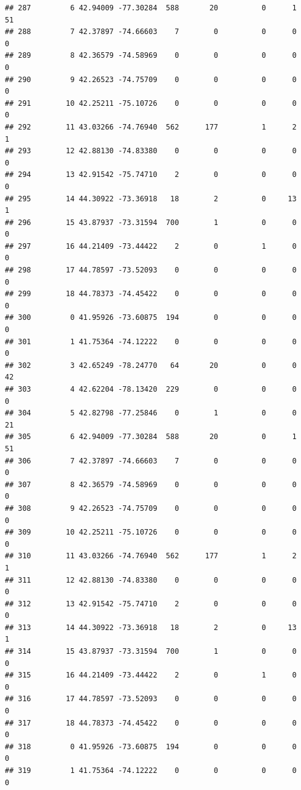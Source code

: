 \documentclass[
]{article}
\begin{document}
\begin{verbatim}
## 287         6 42.94009 -77.30284  588       20          0      1           51
## 288         7 42.37897 -74.66603    7        0          0      0            0
## 289         8 42.36579 -74.58969    0        0          0      0            0
## 290         9 42.26523 -74.75709    0        0          0      0            0
## 291        10 42.25211 -75.10726    0        0          0      0            0
## 292        11 43.03266 -74.76940  562      177          1      2            1
## 293        12 42.88130 -74.83380    0        0          0      0            0
## 294        13 42.91542 -75.74710    2        0          0      0            0
## 295        14 44.30922 -73.36918   18        2          0     13            1
## 296        15 43.87937 -73.31594  700        1          0      0            0
## 297        16 44.21409 -73.44422    2        0          1      0            0
## 298        17 44.78597 -73.52093    0        0          0      0            0
## 299        18 44.78373 -74.45422    0        0          0      0            0
## 300         0 41.95926 -73.60875  194        0          0      0            0
## 301         1 41.75364 -74.12222    0        0          0      0            0
## 302         3 42.65249 -78.24770   64       20          0      0           42
## 303         4 42.62204 -78.13420  229        0          0      0            0
## 304         5 42.82798 -77.25846    0        1          0      0           21
## 305         6 42.94009 -77.30284  588       20          0      1           51
## 306         7 42.37897 -74.66603    7        0          0      0            0
## 307         8 42.36579 -74.58969    0        0          0      0            0
## 308         9 42.26523 -74.75709    0        0          0      0            0
## 309        10 42.25211 -75.10726    0        0          0      0            0
## 310        11 43.03266 -74.76940  562      177          1      2            1
## 311        12 42.88130 -74.83380    0        0          0      0            0
## 312        13 42.91542 -75.74710    2        0          0      0            0
## 313        14 44.30922 -73.36918   18        2          0     13            1
## 314        15 43.87937 -73.31594  700        1          0      0            0
## 315        16 44.21409 -73.44422    2        0          1      0            0
## 316        17 44.78597 -73.52093    0        0          0      0            0
## 317        18 44.78373 -74.45422    0        0          0      0            0
## 318         0 41.95926 -73.60875  194        0          0      0            0
## 319         1 41.75364 -74.12222    0        0          0      0            0

\end{verbatim}
\end{document}
